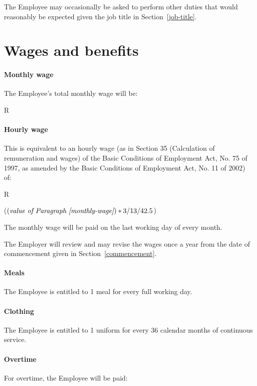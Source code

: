 \documentclass[a4paper,11pt]{article}
\begin{document}
\para The Employee may occasionally be asked to perform other duties that would
reasonably be expected given the job title in Section~\ref{job-title}.

\section{Wages and benefits}
\label{wages}

\paragraph{Monthly wage}\label{monthly-wage} The Employee's total monthly wage
will be:

\begin{center}
  R 
\end{center}

\paragraph{Hourly wage}\label{hourly-wage} This is equivalent to an hourly wage
(as in Section 35 (Calculation of remuneration and wages) of the Basic
Conditions of Employment Act, No. 75 of 1997, as amended by the Basic
Conditions of Employment Act, No. 11 of 2002) of:

\begin{center}
  R 

  (\((\text{\textit{value of Paragraph~\ref{monthly-wage}}}) * 3 / 13 / 42.5 \))
\end{center}

\para\label{monthly-wage-pay-day} The monthly wage will be paid on the last
working day of every month.

\para The Employer will review and may revise the wages once a year from the
date of commencement given in Section~\ref{commencement}.

\paragraph{Meals} The Employee is entitled to 1 meal for every full working
day.

\paragraph{Clothing} The Employee is entitled to 1 uniform for every 36 calendar
months of continuous service.

\paragraph{Overtime}\label{overtime-wage} For overtime, the Employee will be
paid:
\end{document}

